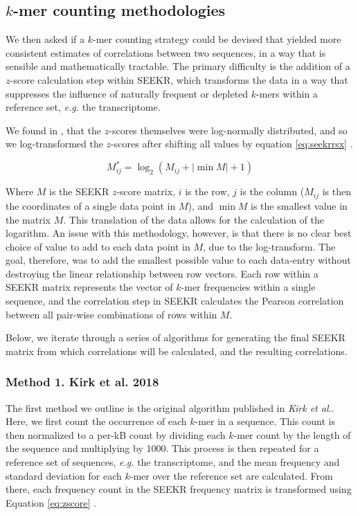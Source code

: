 \subsection{$k$-mer counting methodologies}

We then asked if a $k$-mer counting strategy could be devised that yielded more consistent estimates of correlations between two sequences, in a way that is sensible and mathematically tractable. The primary difficulty is the addition of a $z$-score calculation step within SEEKR, which transforms the data in a way that suppresses the influence of naturally frequent or depleted $k$-mers within a reference set, \emph{e.g.} the transcriptome. 

We found in \cite{Sprague2019NonlinearDomains}, that the $z$-scores themselves were log-normally distributed, and so we log-transformed the $z$-scores after shifting all values by equation \ref{eq:seekrrsx} \cite{Sprague2019NonlinearDomains}.

\begin{equation}
M_{ij}^* = \log_2{\left(M_{ij} + |\min{M}|+1\right)}
\label{eq:seekrrsx}
\end{equation}


Where $M$ is the SEEKR $z$-score matrix, $i$ is the row, $j$ is the column ($M_{ij}$ is then the coordinates of a single data point in $M$), and $\min{M}$ is the smallest value in the matrix $M$. This translation of the data allows for the calculation of the logarithm. An issue with this methodology, however, is that there is no clear best choice of value to add to each data point in $M$, due to the log-transform. The goal, therefore, was to add the smallest possible value to each data-entry without destroying the linear relationship between row vectors. Each row within a SEEKR matrix represents the vector of $k$-mer frequencies within a single sequence, and the correlation step in SEEKR calculates the Pearson correlation between all pair-wise combinations of rows within $M$.

Below, we iterate through a series of algorithms for generating the final SEEKR matrix from which correlations will be calculated, and the resulting correlations.  

\subsubsection{Method 1. Kirk et al. 2018}

The first method we outline is the original algorithm published in \emph{Kirk et al.}. Here, we first count the occurrence of each $k$-mer in a sequence. This count is then normalized to a per-kB count by dividing each $k$-mer count by the length of the sequence and multiplying by 1000. This process is then repeated for a reference set of sequences, \emph{e.g.} the transcriptome, and the mean frequency and standard deviation for each $k$-mer over the reference set are calculated. From there, each frequency count in the SEEKR frequency matrix is transformed using Equation \ref{eq:zscore} \cite{Kirk2018FunctionalContent}.  

